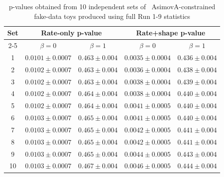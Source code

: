 \begin{table}
\centering
\begin{tabular}{| c | c | c | c | c |}
\hline
\multirow{2}{*}{Set} & \multicolumn{2}{|c|}{Rate-only p-value}     & \multicolumn{2}{|c|}{Rate+shape p-value} \\
\cline{2-5}
   				     & $\beta = 0$           & $\beta = 1$         & $\beta = 0$           & $\beta = 1$         \\
\hline
1                    & $ 0.0101 \pm 0.0007 $ & $ 0.463 \pm 0.004 $ & $ 0.0035 \pm 0.0004 $ & $ 0.436 \pm 0.004 $ \\
2                    & $ 0.0102 \pm 0.0007 $ & $ 0.463 \pm 0.004 $ & $ 0.0036 \pm 0.0004 $ & $ 0.438 \pm 0.004 $ \\
3                    & $ 0.0102 \pm 0.0007 $ & $ 0.463 \pm 0.004 $ & $ 0.0038 \pm 0.0004 $ & $ 0.439 \pm 0.004 $ \\
4                    & $ 0.0102 \pm 0.0007 $ & $ 0.464 \pm 0.004 $ & $ 0.0038 \pm 0.0004 $ & $ 0.440 \pm 0.004 $ \\
5                    & $ 0.0102 \pm 0.0007 $ & $ 0.464 \pm 0.004 $ & $ 0.0041 \pm 0.0005 $ & $ 0.440 \pm 0.004 $ \\
6                    & $ 0.0103 \pm 0.0007 $ & $ 0.465 \pm 0.004 $ & $ 0.0041 \pm 0.0005 $ & $ 0.440 \pm 0.004 $ \\
7                    & $ 0.0103 \pm 0.0007 $ & $ 0.465 \pm 0.004 $ & $ 0.0042 \pm 0.0005 $ & $ 0.441 \pm 0.004 $ \\
8                    & $ 0.0103 \pm 0.0007 $ & $ 0.465 \pm 0.004 $ & $ 0.0042 \pm 0.0005 $ & $ 0.441 \pm 0.004 $ \\
9                    & $ 0.0103 \pm 0.0007 $ & $ 0.465 \pm 0.004 $ & $ 0.0044 \pm 0.0005 $ & $ 0.443 \pm 0.004 $ \\
10                   & $ 0.0103 \pm 0.0007 $ & $ 0.467 \pm 0.004 $ & $ 0.0046 \pm 0.0005 $ & $ 0.444 \pm 0.004 $ \\
\hline
\end{tabular}
\caption{
	p-values obtained from 10 independent sets of \NToysFakeDataRatePlusShape\ AsimovA-constrained fake-data toys produced using full Run 1-9 statistics
}
\label{tab:pval_stability_Run1-9d_values}
\end{table}

